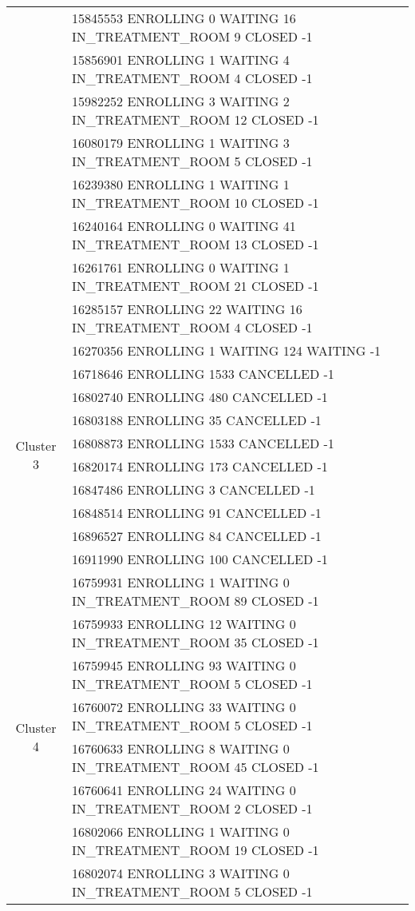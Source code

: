 {\begin{longtable}{|c|p{}|}
		& 15845553 ENROLLING 0 WAITING 16 IN\_TREATMENT\_ROOM 9 CLOSED -1 \\
		& 15856901 ENROLLING 1 WAITING 4 IN\_TREATMENT\_ROOM 4 CLOSED -1 \\
		& 15982252 ENROLLING 3 WAITING 2 IN\_TREATMENT\_ROOM 12 CLOSED -1 \\
		& 16080179 ENROLLING 1 WAITING 3 IN\_TREATMENT\_ROOM 5 CLOSED -1 \\
		& 16239380 ENROLLING 1 WAITING 1 IN\_TREATMENT\_ROOM 10 CLOSED -1 \\
		& 16240164 ENROLLING 0 WAITING 41 IN\_TREATMENT\_ROOM 13 CLOSED -1 \\
		& 16261761 ENROLLING 0 WAITING 1 IN\_TREATMENT\_ROOM 21 CLOSED -1 \\
		& 16285157 ENROLLING 22 WAITING 16 IN\_TREATMENT\_ROOM 4 CLOSED -1 \\
		\hline
		\multirow{10}{*}{Cluster 3}
		& 16270356 ENROLLING 1 WAITING 124 WAITING -1 \\
		& 16718646 ENROLLING 1533 CANCELLED -1 \\
		& 16802740 ENROLLING 480 CANCELLED -1 \\
		& 16803188 ENROLLING 35 CANCELLED -1 \\
		& 16808873 ENROLLING 1533 CANCELLED -1 \\
		& 16820174 ENROLLING 173 CANCELLED -1 \\
		& 16847486 ENROLLING 3 CANCELLED -1 \\
		& 16848514 ENROLLING 91 CANCELLED -1 \\
		& 16896527 ENROLLING 84 CANCELLED -1 \\
		& 16911990 ENROLLING 100 CANCELLED -1 \\
		\hline
		\multirow{10}{*}{Cluster 4}
		& 16759931 ENROLLING 1 WAITING 0 IN\_TREATMENT\_ROOM 89 CLOSED -1 \\
		& 16759933 ENROLLING 12 WAITING 0 IN\_TREATMENT\_ROOM 35 CLOSED -1 \\
		& 16759945 ENROLLING 93 WAITING 0 IN\_TREATMENT\_ROOM 5 CLOSED -1 \\
		& 16760072 ENROLLING 33 WAITING 0 IN\_TREATMENT\_ROOM 5 CLOSED -1 \\
		& 16760633 ENROLLING 8 WAITING 0 IN\_TREATMENT\_ROOM 45 CLOSED -1 \\
		& 16760641 ENROLLING 24 WAITING 0 IN\_TREATMENT\_ROOM 2 CLOSED -1 \\
		& 16802066 ENROLLING 1 WAITING 0 IN\_TREATMENT\_ROOM 19 CLOSED -1 \\
		& 16802074 ENROLLING 3 WAITING 0 IN\_TREATMENT\_ROOM 5 CLOSED -1 \\

\end{longtable}}
